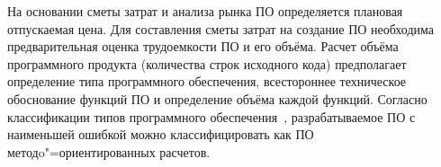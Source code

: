\def \workingHoursInMonth{160}

\def \workingHoursInDay{8}

\def \tariffRate{1150000}

\def \bonusRate{1.5}

\def \additionalSalaryRate{20}

\def \socialProtectionRate{34}

\def \bgsRate{0.7}

\def \businessTripRate{15}

\def \otherExpenseRate{20}

\def \overheadExpenseRate{100}

\def \profitability{35}

\def \localRepubTaxRate{3.9}

\def \vatRate{20}

\def \profitTaxRate{18}

\def \materialsRate{3}

\def \debugRate{15} %

\def \machineHourCost{25000}

\def \supportAndAdaptationRate{30}

На основании сметы затрат и анализа рынка ПО определяется плановая отпускаемая цена.
Для составления сметы затрат на создание ПО необходима предварительная оценка трудоемкости ПО и его объёма.
Расчет объёма программного продукта (количества строк исходного кода) предполагает определение типа программного обеспечения, всестороннее техническое обоснование функций ПО и определение объёма каждой функций.
Согласно классификации типов программного обеспечения~\cite[с.~59,~приложение 1]{palicyn_2006}, разрабатываемое ПО с наименьшей ошибкой можно классифицировать как ПО методo"=ориентированных расчетов.

